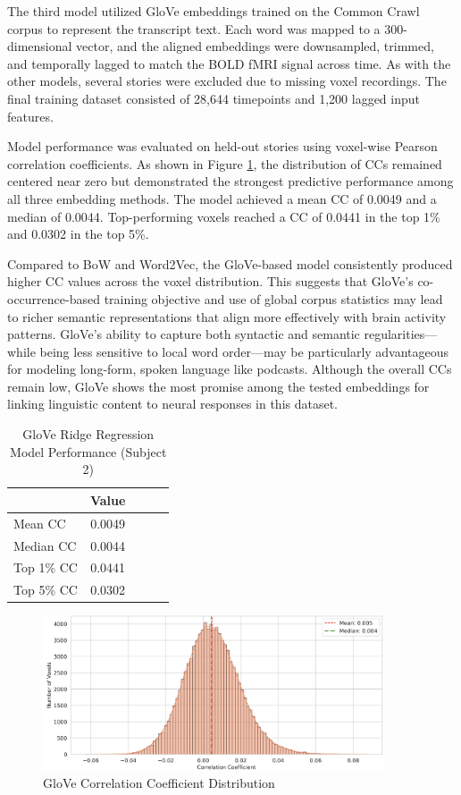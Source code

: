 \documentclass[11pt,letterpaper]{article}
\begin{document}
The third model utilized GloVe embeddings trained on the Common Crawl corpus to represent the transcript text. Each word was mapped to a 300-dimensional vector, and the aligned embeddings were downsampled, trimmed, and temporally lagged to match the BOLD fMRI signal across time. As with the other models, several stories were excluded due to missing voxel recordings. The final training dataset consisted of 28,644 timepoints and 1,200 lagged input features.

Model performance was evaluated on held-out stories using voxel-wise Pearson correlation coefficients. As shown in Figure \ref{fig:prob_hist_glove}, the distribution of CCs remained centered near zero but demonstrated the strongest predictive performance among all three embedding methods. The model achieved a mean CC of 0.0049 and a median of 0.0044. Top-performing voxels reached a CC of 0.0441 in the top 1\% and 0.0302 in the top 5\%.

Compared to BoW and Word2Vec, the GloVe-based model consistently produced higher CC values across the voxel distribution. This suggests that GloVe’s co-occurrence-based training objective and use of global corpus statistics may lead to richer semantic representations that align more effectively with brain activity patterns. GloVe's ability to capture both syntactic and semantic regularities—while being less sensitive to local word order—may be particularly advantageous for modeling long-form, spoken language like podcasts. Although the overall CCs remain low, GloVe shows the most promise among the tested embeddings for linking linguistic content to neural responses in this dataset.

\begin{table}[H]
\centering
\begin{tabular}{lcccc}
\toprule
\textbf{} & \textbf{Value} \\
\midrule
Mean CC    & 0.0049 \\
Median CC  & 0.0044 \\
Top 1\% CC & 0.0441 \\
Top 5\% CC & 0.0302 \\
\bottomrule
\end{tabular}
\caption{GloVe Ridge Regression Model Performance (Subject 2)}
\label{tab:glove_cc_results}
\end{table}

\begin{figure}[h]
    \centering
    \includegraphics[width=0.9\textwidth]{figs/cc-dist-GloVe.png}
    \caption{GloVe Correlation Coefficient Distribution}
    \label{fig:prob_hist_glove}
\end{figure}
\end{document}
